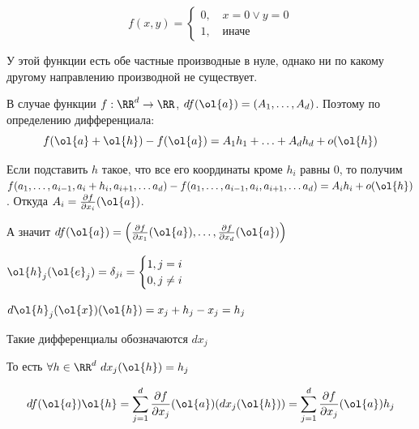\begin{example}{}{}
    \[
        f(x, y) = \begin{cases}
            0, \quad x = 0 \lor y = 0
            \\
            1, \quad \text{иначе}
        \end{cases}
    \]

    У этой функции есть обе частные производные в нуле,
    однако ни по какому другому направлению производной не существует.
\end{example}

В случае функции \( f : \RR^d \to \RR \),
\( df(\ol{a}) = (A_1, \ldots, A_d) \).
Поэтому по определению дифференциала:
\[
    f(\ol{a} + \ol{h}) - f(\ol{a}) = A_1 h_1 + \ldots + A_d h_d + o(\ol{h})
\]

Если подставить \( h \) такое, что все его координаты кроме \( h_i \) равны \( 0 \),
то получим
\(
    f(a_1, \ldots, a_{i - 1}, a_i + h_i, a_{i + 1}, \ldots a_d) - f(a_1, \ldots, a_{i - 1}, a_i, a_{i + 1}, \ldots a_d)
    =
    A_i h_i + o(\ol{h})
\).
Откуда \( A_i = \frac{\partial f}{\partial x_i} (\ol{a}) \).

А значит \( df(\ol{a}) = \left( \frac{\partial f}{\partial x_1} (\ol{a}), \ldots, \frac{\partial f}{\partial x_d} (\ol{a}) \right) \)

\begin{remark}{}{}
    \(
        \displaystyle
        \ol{h}_j (\ol{e}_j) = \delta_{ji} = \begin{cases}
            1, j = i
            \\
            0, j \neq i
        \end{cases}
    \)

    \(
        d \ol{h}_j (\ol{x}) (\ol{h}) = x_j + h_j - x_j = h_j
    \)

    Такие дифференциалы обозначаются \( dx_j \)

    То есть \( \forall h \in \RR^d \ dx_j (\ol{h}) = h_j \)
\end{remark}

\begin{remark}{}{}
    \[
        df (\ol{a}) \ol{h}
        =
        \sum\limits_{j = 1}^d \frac{\partial f}{\partial x_j} (\ol{a}) (dx_j (\ol{h}))
        =
        \sum\limits_{j = 1}^d \frac{\partial f}{\partial x_j} (\ol{a}) h_j
    \]
\end{remark}

